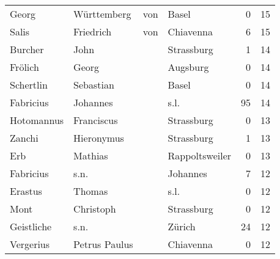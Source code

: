 \documentclass[10pt,a4paper,landscape]{article}
\begin{document}
\begin{longtable}{llllrr}
                    Georg &                        Württemberg &         von &                                       Basel &          0 &        15 \\
                    Salis &                          Friedrich &         von &                                   Chiavenna &          6 &        15 \\
                  Burcher &                               John &             &                                  Strassburg &          1 &        14 \\
                  Frölich &                              Georg &             &                                    Augsburg &          0 &        14 \\
                Schertlin &                          Sebastian &             &                                       Basel &          0 &        14 \\
                Fabricius &                           Johannes &             &                                        s.l. &         95 &        14 \\
               Hotomannus &                         Franciscus &             &                                  Strassburg &          0 &        13 \\
                   Zanchi &                         Hieronymus &             &                                  Strassburg &          1 &        13 \\
                      Erb &                            Mathias &             &                              Rappoltsweiler &          0 &        13 \\
                Fabricius &                               s.n. &             &                                    Johannes &          7 &        12 \\
                  Erastus &                             Thomas &             &                                        s.l. &          0 &        12 \\
                     Mont &                          Christoph &             &                                  Strassburg &          0 &        12 \\
               Geistliche &                               s.n. &             &                                      Zürich &         24 &        12 \\
                Vergerius &                      Petrus Paulus &             &                                   Chiavenna &          0 &        12 \\

\end{longtable}
\end{document}
